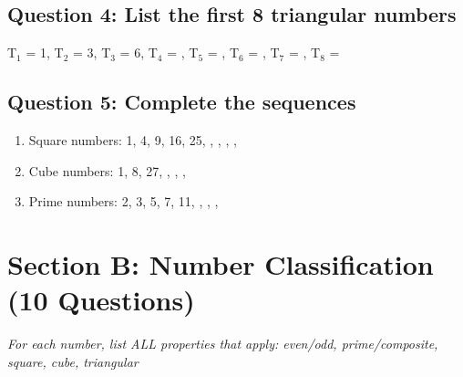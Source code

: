 \documentclass{article}
\begin{document}
\subsection*{Question 4: List the first 8 triangular numbers}
T$_1$ = 1, T$_2$ = 3, T$_3$ = 6, T$_4$ = \underline{\hspace{1cm}}, T$_5$ = \underline{\hspace{1cm}}, T$_6$ = \underline{\hspace{1cm}}, T$_7$ = \underline{\hspace{1cm}}, T$_8$ = \underline{\hspace{1cm}}

\subsection*{Question 5: Complete the sequences}
\begin{enumerate}
    \item Square numbers: 1, 4, 9, 16, 25, \underline{\hspace{1cm}}, \underline{\hspace{1cm}}, \underline{\hspace{1cm}}, \underline{\hspace{1cm}}, \underline{\hspace{1cm}}
    \item Cube numbers: 1, 8, 27, \underline{\hspace{1cm}}, \underline{\hspace{1cm}}, \underline{\hspace{1cm}}, \underline{\hspace{1cm}}
    \item Prime numbers: 2, 3, 5, 7, 11, \underline{\hspace{1cm}}, \underline{\hspace{1cm}}, \underline{\hspace{1cm}}, \underline{\hspace{1cm}}
\end{enumerate}

\section{Section B: Number Classification (10 Questions)}
\textit{For each number, list ALL properties that apply: even/odd, prime/composite, square, cube, triangular}
\end{document}

